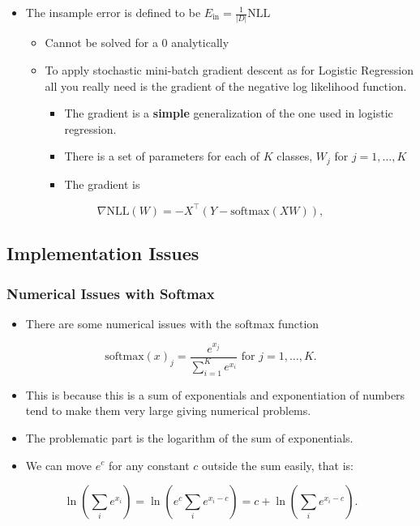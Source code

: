\documentclass[11pt]{article}
\begin{document}
\begin{itemize}
\item The insample error is defined to be  \(E_\textrm{in} = \frac{1}{|D|} \textrm{NLL}\)
\begin{itemize}
\item Cannot be solved for a 0 analytically
\item To apply stochastic mini-batch gradient descent as for Logistic Regression all you really need is the gradient of the negative log likelihood function.
\begin{itemize}
\item The gradient is a \textbf{simple} generalization of the one used in logistic regression.
\item There is a set of parameters for each of \(K\) classes, \(W_j\) for \(j=1,\ldots,K\)
\item The gradient is
\end{itemize}
\end{itemize}
\end{itemize}
$$
\nabla \textrm{NLL}(W) =
-X^\intercal
(Y - \textrm{softmax}(XW)),
$$

\subsection{Implementation Issues}
\label{sec:orgb8164d9}
\subsubsection{Numerical Issues with Softmax}
\label{sec:org09cd7ff}
\begin{itemize}
\item There are some numerical issues with the softmax function
\end{itemize}

$$
\textrm{softmax}(x)_j = \frac{e^{x_j}}{\sum_{i=1}^K e^{x_i}} \textrm{ for } j=1,\ldots,K.
$$
\begin{itemize}
\item This is because this is a sum of exponentials and exponentiation of numbers tend to make them very large giving numerical problems.

\item The problematic part is the logarithm of the sum of exponentials.
\item We can move \(e^c\) for any constant \(c\) outside the sum easily, that is:
\end{itemize}
$$
\ln\left(\sum_i e^{x_i}\right) =
\ln\left(e^c \sum_i e^{x_i-c}\right) =
c + \ln\left(\sum_i e^{x_i -c}\right).
$$
\end{document}
